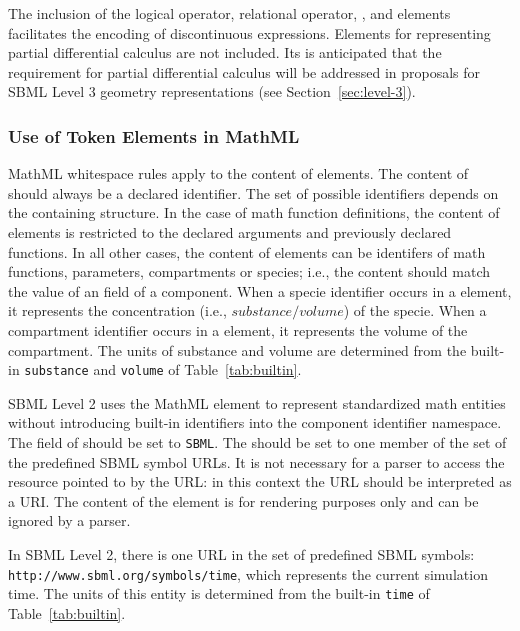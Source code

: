 \documentclass[10pt,twocolumntoc]{cekarticle}
\newcommand{\vref}[1]{\ref{#1}}
\begin{document}
The inclusion of the logical operator, relational operator,
,  and  elements facilitates
the encoding of discontinuous expressions.  Elements for representing
partial differential calculus are not included.  Its is anticipated that
the requirement for partial differential calculus will be addressed in
proposals for SBML Level 3 geometry representations (see
Section~\ref{sec:level-3}).

\subsubsection{Use of Token Elements in MathML}
\label{sec:mathmltokens}

MathML whitespace rules apply to the content of  elements. The
content of  should always be a declared identifier.  The set of
possible identifiers depends on the containing structure.  In the case of
math function definitions, the content of  elements is restricted
to the declared arguments and previously declared functions.  In all other
cases, the content of  elements can be identifers of math
functions, parameters, compartments or species; i.e., the content should
match the value of an  field of a component.  When a specie
identifier occurs in a  element, it represents the concentration
(i.e., $substance/volume$) of the specie.  When a compartment identifier
occurs in a  element, it represents the volume of the
compartment. The units of substance and volume are determined from the
built-in \texttt{substance} and \texttt{volume} of
Table~\vref{tab:builtin}.

SBML Level 2 uses the MathML  element to represent
standardized math entities without introducing built-in identifiers into
the component identifier namespace.  The  field of
 should be set to \texttt{SBML}.  The 
should be set to one member of the set of the predefined SBML symbol URLs.
It is not necessary for a parser to access the resource pointed to by the
URL: in this context the URL should be interpreted as a URI.  The content
of the  element is for rendering purposes only and can be
ignored by a parser.

In SBML Level 2, there is one URL in the set of predefined SBML symbols:
 \texttt{http://www.sbml.org/symbols/time}, which represents the
current simulation time.  The units of this entity is determined
from the built-in \texttt{time} of Table~\vref{tab:builtin}.
\end{document}
